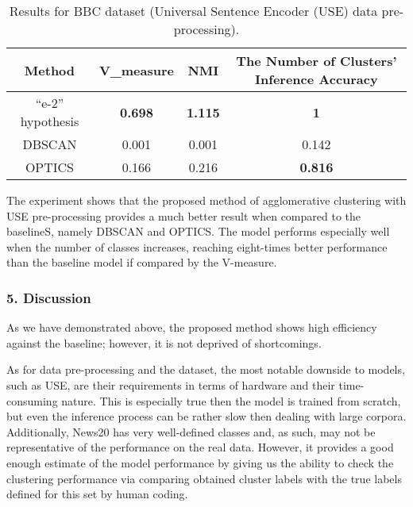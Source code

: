 \begin{table}[ht]%
	\centering
	\caption{Results for BBC dataset (Universal Sentence Encoder (USE) data pre-processing).}%
	\label{tab:bbcDatasetResults}%
		\begin{tabular}{ c  c  c  c }%
			\toprule
			Method & V\_measure & NMI & The Number of Clusters’ Inference Accuracy \\
			\hline
			“e-2” hypothesis & \textbf{0.698} & \textbf{1.115} & \textbf{1} \\
			DBSCAN & 0.001 & 0.001 & 0.142 \\
			OPTICS & 0.166 & 0.216 & \textbf{0.816} \\
			\bottomrule
		\end{tabular}%
\end{table}

The experiment shows that the proposed method of agglomerative clustering with USE pre-processing provides a much better result when compared to the baselineS, namely DBSCAN and OPTICS. The model performs especially well when the number of classes increases, reaching eight-times better performance than the baseline model if compared by the V-measure.

\subsubsection{5. Discussion}

As we have demonstrated above, the proposed method shows high efficiency against the baseline; however, it is not deprived of shortcomings.

As for data pre-processing and the dataset, the most notable downside to models, such as USE, are their requirements in terms of hardware and their time-consuming nature. This is especially true then the model is trained from scratch, but even the inference process can be rather slow then dealing with large corpora. Additionally, News20 has very well-defined classes and, as such, may not be representative of the performance on the real data. However, it provides a good enough estimate of the model performance by giving us the ability to check the clustering performance via comparing obtained cluster labels with the true labels defined for this set by human coding.

